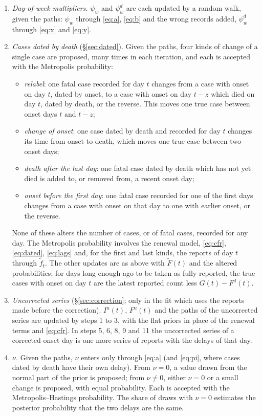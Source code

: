 \documentclass[11pt,a4paper]{article}
\begin{document}
\begin{enumerate}
removed between reports are known. $\delta$ is drawn from its beta
conditional and $\eta$ from its gamma conditional; $\rho$ is updated by a
random walk on the logit scale.
\item \emph{Day-of-week multipliers.} $\psi_w$ and $\psi^{d}_w$ are each
updated by a random walk, given the paths: $\psi_w$ through \eqref{eq:a},
\eqref{eq:b} and the wrong records added, $\psi^{d}_w$ through \eqref{eq:x}
and \eqref{eq:y}.
\item \emph{Cases dated by death} (\S\ref{sec:dated}). Given the paths,
four kinds of change of a single case are proposed, many times in each
iteration, and each is accepted with the Metropolis probability:
\begin{itemize}
\item \emph{relabel}: one fatal case recorded for day $t$ changes from a
case with onset on day $t$, dated by onset, to a case with onset on day
$t-z$ which died on day $t$, dated by death, or the reverse. This moves one
true case between onset days $t$ and $t-z$;
\item \emph{change of onset}: one case dated by death and recorded for day
$t$ changes its time from onset to death, which moves one true case between
two onset days;
\item \emph{death after the last day}: one fatal case dated by death which
has not yet died is added to, or removed from, a recent onset day;
\item \emph{onset before the first day}: one fatal case recorded for one of
the first days changes from a case with onset on that day to one with
earlier onset, or the reverse.
\end{itemize}
None of these alters the number of cases, or of fatal cases, recorded for
any day. The Metropolis probability involves the renewal model,
\eqref{eq:cfr}, \eqref{eq:dated}, \eqref{eq:lags} and, for the first and
last kinds, the reports of day $t$ through $\tilde{f}_t$. The other updates
are as above with $\tilde{F}(t)$ and the altered probabilities; for days
long enough ago to be taken as fully reported, the true cases with onset on
day $t$ are the latest reported count less $G(t)-F^{d}(t)$.
\item \emph{Uncorrected series} (\S\ref{sec:correction}; only in the fit
which uses the reports made before the correction). $I^{u}(t)$,
$F^{u}(t)$ and the paths of the uncorrected series are updated by steps 1
to 3, with the flat priors in place of the renewal terms and
\eqref{eq:cfr}. In steps 5, 6, 8, 9 and 11 the uncorrected series of a
corrected onset day is one more series of reports with the delays of that
day.
\item \emph{$\nu$.} Given the paths, $\nu$ enters only through
\eqref{eq:a} (and \eqref{eq:pi}, where cases dated by death have their own
delay). From $\nu=0$, a value drawn from the normal part of the prior is
proposed; from $\nu\ne0$, either $\nu=0$ or a small change is proposed,
with equal probability. Each is accepted with the Metropolis--Hastings
probability. The share of draws with $\nu=0$ estimates the posterior
probability that the two delays are the same.
\end{enumerate}
\end{document}
